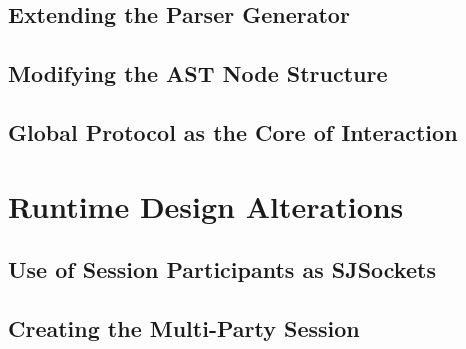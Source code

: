 \subsection{Extending the Parser Generator}

\subsection{Modifying the AST Node Structure}

\subsection{Global Protocol as the Core of Interaction}



\section{Runtime Design Alterations}

\subsection{Use of Session Participants as SJSockets}

\subsection{Creating the Multi-Party Session}